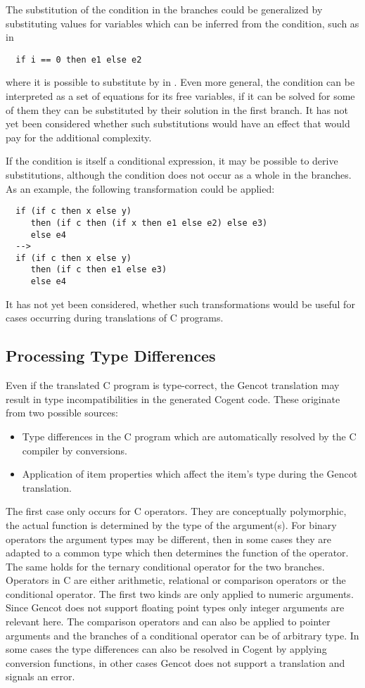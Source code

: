 The substitution of the condition in the branches could be generalized by substituting values for variables which can be
inferred from the condition, such as in
\begin{verbatim}
  if i == 0 then e1 else e2
\end{verbatim}
where it is possible to substitute  by  in . Even more general, the condition can be interpreted as
a set of equations for its free variables, if it can be solved for some of them they can be substituted by their solution
in the first branch. It has not yet been considered whether such substitutions would have an effect that would pay for the 
additional complexity.

If the condition is itself a conditional expression, it may be possible to derive substitutions, although the condition does
not occur as a whole in the branches. As an example, the following transformation could be applied:
\begin{verbatim}
  if (if c then x else y) 
     then (if c then (if x then e1 else e2) else e3) 
     else e4 
  -->
  if (if c then x else y) 
     then (if c then e1 else e3)
     else e4
\end{verbatim}
It has not yet been considered, whether such transformations would be useful for cases occurring during translations of C programs.

\subsection{Processing Type Differences}
\label{impl-post-types}

Even if the translated C program is type-correct, the Gencot translation may result in type incompatibilities in the generated
Cogent code. These originate from two possible sources:
\begin{itemize}
\item Type differences in the C program which are automatically resolved by the C compiler by conversions.
\item Application of item properties which affect the item's type during the Gencot translation.
\end{itemize}

The first case only occurs for C operators. They are conceptually polymorphic, the actual function is determined by the type
of the argument(s). For binary operators the argument types may be different, then in some cases they are adapted to a common
type which then determines the function of the operator. The same holds for the ternary conditional operator for the two
branches. Operators in C are either arithmetic, relational or comparison operators or the conditional operator. The first
two kinds are only applied to numeric arguments. Since Gencot does not support floating point types only integer arguments
are relevant here. The comparison operators \code{==} and \code{!=} can also be applied to pointer arguments and the branches
of a conditional operator can be of arbitrary type. In some cases the type differences can also be resolved in Cogent by
applying conversion functions, in other cases Gencot does not support a translation and signals an error.

